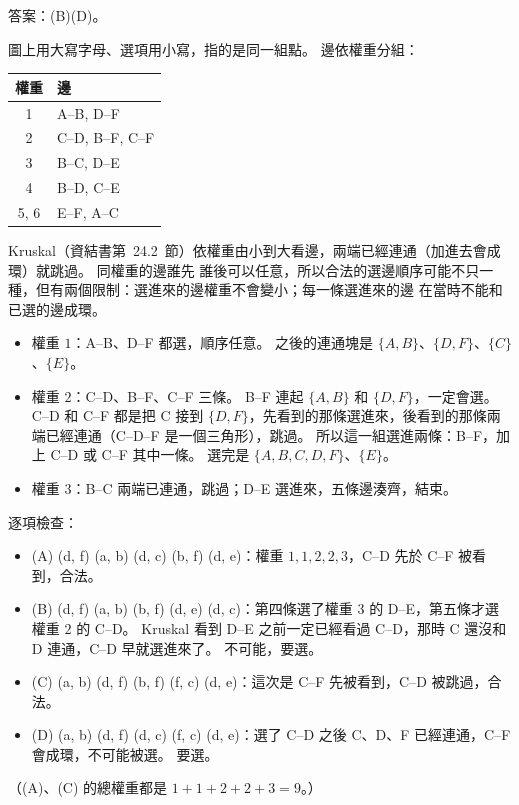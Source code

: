 \begin{pastsoln}
答案：(B)(D)。

圖上用大寫字母、選項用小寫，指的是同一組點。 邊依權重分組：
\begin{center}
\small
\begin{tabular}{cl}
\toprule
權重 & 邊 \\
\midrule
1 & A--B, D--F \\
2 & C--D, B--F, C--F \\
3 & B--C, D--E \\
4 & B--D, C--E \\
5, 6 & E--F, A--C \\
\bottomrule
\end{tabular}
\end{center}
Kruskal（資結書第~24.2~節）依權重由小到大看邊，兩端已經連通（加進去會成環）就跳過。 同權重的邊誰先
誰後可以任意，所以合法的選邊順序可能不只一種，但有兩個限制：選進來的邊權重不會變小；每一條選進來的邊
在當時不能和已選的邊成環。
\begin{itemize}
\item 權重 $1$：A--B、D--F 都選，順序任意。 之後的連通塊是 $\{A, B\}$、$\{D, F\}$、$\{C\}$、$\{E\}$。
\item 權重 $2$：C--D、B--F、C--F 三條。 B--F 連起 $\{A, B\}$ 和 $\{D, F\}$，一定會選。 C--D 和 C--F 都是把
C 接到 $\{D, F\}$，先看到的那條選進來，後看到的那條兩端已經連通（C--D--F 是一個三角形），跳過。
所以這一組選進兩條：B--F，加上 C--D 或 C--F 其中一條。 選完是 $\{A, B, C, D, F\}$、$\{E\}$。
\item 權重 $3$：B--C 兩端已連通，跳過；D--E 選進來，五條邊湊齊，結束。
\end{itemize}

逐項檢查：
\begin{itemize}
\item (A) (d, f) (a, b) (d, c) (b, f) (d, e)：權重 $1, 1, 2, 2, 3$，C--D 先於 C--F 被看到，合法。
\item (B) (d, f) (a, b) (b, f) (d, e) (d, c)：第四條選了權重 $3$ 的 D--E，第五條才選權重 $2$ 的 C--D。
Kruskal 看到 D--E 之前一定已經看過 C--D，那時 C 還沒和 D 連通，C--D 早就選進來了。 不可能，要選。
\item (C) (a, b) (d, f) (b, f) (f, c) (d, e)：這次是 C--F 先被看到，C--D 被跳過，合法。
\item (D) (a, b) (d, f) (d, c) (f, c) (d, e)：選了 C--D 之後 C、D、F 已經連通，C--F 會成環，不可能被選。
要選。
\end{itemize}
（(A)、(C) 的總權重都是 $1 + 1 + 2 + 2 + 3 = 9$。）
\end{pastsoln}
